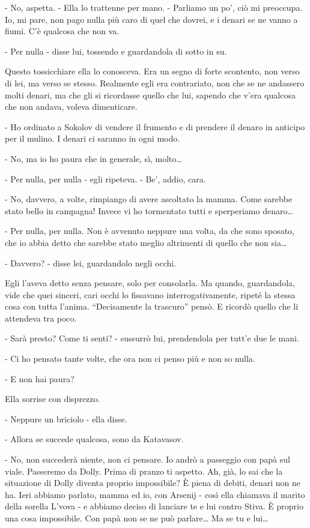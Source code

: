 - No, aspetta. - Ella lo trattenne per mano. - Parliamo un po', ciò mi preoccupa. Io, mi pare, non pago nulla più caro di quel che dovrei, e i denari se ne vanno a fiumi. C'è qualcosa che non va. 

- Per nulla - disse lui, tossendo e guardandola di sotto in su. 

Questo tossicchiare ella lo conosceva. Era un segno di forte scontento, non verso di lei, ma verso se stesso. Realmente egli era contrariato, non che se ne andassero molti denari, ma che gli si ricordasse quello che lui, sapendo che v'era qualcosa che non andava, voleva dimenticare. 

- Ho ordinato a Sokolov di vendere il frumento e di prendere il denaro in anticipo per il mulino. I denari ci saranno in ogni modo. 

- No, ma io ho paura che in generale, sì, molto\ldots{} 

- Per nulla, per nulla - egli ripeteva. - Be', addio, cara. 

- No, davvero, a volte, rimpiango di avere ascoltato la mamma. Come sarebbe stato bello in campagna! Invece vi ho tormentato tutti e sperperiamo denaro\ldots{} 

- Per nulla, per nulla. Non è avvenuto neppure una volta, da che sono sposato, che io abbia detto che sarebbe stato meglio altrimenti di quello che non sia\ldots{} 

- Davvero? - disse lei, guardandolo negli occhi. 

Egli l'aveva detto senza pensare, solo per consolarla. Ma quando, guardandola, vide che quei sinceri, cari occhi lo fissavano interrogativamente, ripeté la stessa cosa con tutta l'anima. ``Decisamente la trascuro'' pensò. E ricordò quello che li attendeva tra poco. 

- Sarà presto? Come ti senti? - sussurrò lui, prendendola per tutt'e due le mani. 

- Ci ho pensato tante volte, che ora non ci penso più e non so nulla. 

- E non hai paura? 

Ella sorrise con disprezzo. 

- Neppure un briciolo - ella disse. 

- Allora se succede qualcosa, sono da Katavasov. 

- No, non succederà niente, non ci pensare. Io andrò a passeggio con papà sul viale. Passeremo da Dolly. Prima di pranzo ti aspetto. Ah, già, lo sai che la situazione di Dolly diventa proprio impossibile? È piena di debiti, denari non ne ha. Ieri abbiamo parlato, mamma ed io, con Arsenij - così ella chiamava il marito della sorella L'vova - e abbiamo deciso di lanciare te e lui contro Stiva. È proprio una cosa impossibile. Con papà non se ne può parlare\ldots{} Ma se tu e lui\ldots{} 

